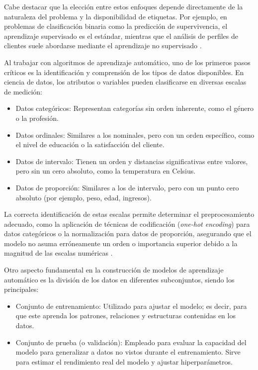 \documentclass[12pt]{article}
\begin{document}
\cite{De0a100enIA}

Cabe destacar que la elección entre estos enfoques depende directamente de la naturaleza del problema y la disponibilidad de etiquetas. Por ejemplo, en problemas de clasificación binaria como la predicción de supervivencia, el aprendizaje supervisado es el estándar, mientras que el análisis de perfiles de clientes suele abordarse mediante el aprendizaje no supervisado \cite{hastie2009elements}.


Al trabajar con algoritmos de aprendizaje automático, uno de los primeros pasos críticos es la identificación y comprensión de los tipos de datos disponibles. En ciencia de datos, los atributos o variables pueden clasificarse en diversas escalas de medición:

\begin{itemize}
    \item Datos categóricos: Representan categorías sin orden inherente, como el género o la profesión.
    \item Datos ordinales: Similares a los nominales, pero con un orden específico, como el nivel de educación o la satisfacción del cliente.
    \item Datos de intervalo: Tienen un orden y distancias significativas entre valores, pero sin un cero absoluto, como la temperatura en Celsius.
    \item Datos de proporción: Similares a los de intervalo, pero con un punto cero absoluto (por ejemplo, peso, edad, ingresos).
\end{itemize}

La correcta identificación de estas escalas permite determinar el preprocesamiento adecuado, como la aplicación de técnicas de codificación (\textit{one-hot encoding}) para datos categóricos o la normalización para datos de proporción, asegurando que el modelo no asuma erróneamente un orden o importancia superior debido a la magnitud de las escalas numéricas \cite{james2013introduction}.


Otro aspecto fundamental en la construcción de modelos de aprendizaje automático es la división de los datos en diferentes subconjuntos, siendo los principales:
\begin{itemize}
    \item Conjunto de entrenamiento: Utilizado para ajustar el modelo; es decir, para que este aprenda los patrones, relaciones y estructuras contenidas en los datos.
    \item Conjunto de prueba (o validación): Empleado para evaluar la capacidad del modelo para generalizar a datos no vistos durante el entrenamiento. Sirve para estimar el rendimiento real del modelo y ajustar hiperparámetros.
\end{itemize}
\end{document}
